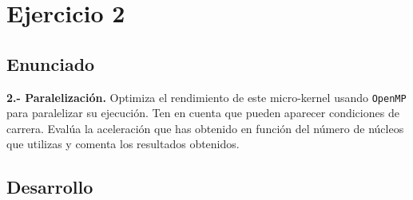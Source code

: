 \section{Ejercicio 2}
\subsection{Enunciado}
\begin{ejer}
    \textbf{2.- Paralelización.} Optimiza el rendimiento de este micro-kernel usando \texttt{OpenMP} para paralelizar su
    ejecución. Ten en cuenta que pueden aparecer condiciones de carrera. Evalúa la aceleración que
    has obtenido en función del número de núcleos que utilizas y comenta los resultados obtenidos.
\end{ejer}
\subsection{Desarrollo}
